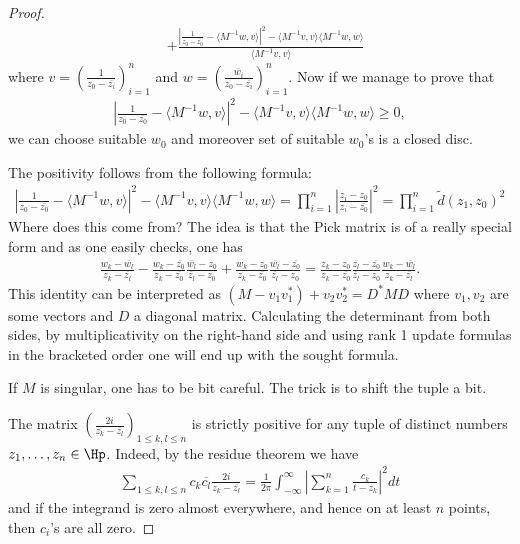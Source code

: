 \begin{proof}
\begin{align*}
		&+ \frac{\left|\frac{1}{z_{0} - \overline{z_{0}}} - \langle M^{-1} w, v \rangle\right|^{2} - \langle M^{-1} v, v \rangle\langle M^{-1} w, w \rangle}{\langle M^{-1} v, v \rangle}
	\end{align*}
	where $v = (\frac{1}{z_{0} - \overline{z_{i}}})_{i = 1}^{n}$ and $w = (\frac{\overline{w_{i}}}{z_{0} - \overline{z_{i}}})_{i = 1}^{n}$. Now if we manage to prove that
	\begin{align*}
	\left|\frac{1}{z_{0} - \overline{z_{0}}} - \langle M^{-1} w, v \rangle\right|^{2} - \langle M^{-1} v, v \rangle\langle M^{-1} w, w \rangle \geq 0,
	\end{align*}
	we can choose suitable $w_{0}$ and moreover set of suitable $w_{0}$'s is a closed disc.

	The positivity follows from the following formula:
	\begin{align*}
		\left|\frac{1}{z_{0} - \overline{z_{0}}} - \langle M^{-1} w, v \rangle\right|^{2} - \langle M^{-1} v, v \rangle\langle M^{-1} w, w \rangle = \prod_{i = 1}^{n} \left|\frac{z_{i} - z_{0}}{z_{i} - \overline{z_{0}}}\right|^{2} = \prod_{i = 1}^{n} \tilde{d}(z_{1}, z_{0})^{2}
	\end{align*}
	Where does this come from? The idea is that the Pick matrix is of a really special form and as one easily checks, one has
	\begin{align*}
		\frac{w_{k} - \overline{w_{l}}}{z_{k} - \overline{z_{l}}} -\frac{w_{k} - \overline{z_{0}}}{z_{k} - \overline{z_{0}}}\frac{\overline{w_{l}} - z_{0}}{\overline{z_{l}} - z_{0}} +  \frac{w_{k} - z_{0}}{z_{k} - \overline{z_{0}}}\frac{\overline{w_{l}} - \overline{z_{0}}}{\overline{z_{l}} - z_{0}} = \frac{z_{k} - z_{0}}{z_{k} - \overline{z_{0}}}\frac{\overline{z_{l}} - \overline{z_{0}}}{\overline{z_{l}} - z_{0}}\frac{w_{k} - \overline{w_{l}}}{z_{k} - \overline{z_{l}}}.
	\end{align*}
	This identity can be interpreted as $(M - v_{1} v_{1}^{*}) + v_{2} v_{2}^{*} = D^{*} M D$ where $v_{1}, v_{2}$ are some vectors and $D$ a diagonal matrix. Calculating the determinant from both sides, by multiplicativity on the right-hand side and using rank 1 update formulas in the bracketed order one will end up with the sought formula.

	If $M$ is singular, one has to be bit careful. The trick is to shift the tuple a bit.

	The matrix $\left(\frac{2 i}{z_{k} - \overline{z_{l}}}\right)_{1 \leq k,l \leq n}$ is strictly positive for any tuple of distinct numbers $z_{1}, \ldots, z_{n} \in \Hp$. Indeed, by the residue theorem we have
	\begin{align*}
		\sum_{1 \leq k,l \leq n} c_{k} \overline{c_{l}} \frac{2 i}{z_{k} - \overline{z_{l}}} = \frac{1}{2 \pi}\int_{-\infty}^{\infty} \left|\sum_{k = 1}^{n} \frac{c_{k}}{t - z_{k}}\right|^{2} d t
	\end{align*}
	and if the integrand is zero almost everywhere, and hence on at least $n$ points, then $c_{i}$'s are all zero.


\end{proof}
